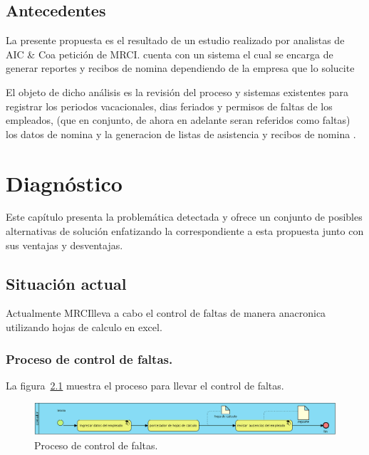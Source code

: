\documentclass[10pt]{book}
\newcommand{\empresa}{AIC \& Co}
\newcommand{\cliente}{MRCI}
\begin{document}
	
\section{Antecedentes} 


	La presente propuesta es el resultado de un estudio realizado por analistas de \empresa a petición de \cliente.
	\Cliente cuenta con un sistema el cual se encarga de generar reportes y recibos de nomina dependiendo de la empresa que lo solucite 
	
	El objeto de dicho análisis es la revisión del proceso y sistemas existentes para registrar los periodos vacacionales, dias feriados y permisos de faltas de los empleados, (que en conjunto, de ahora en adelante seran referidos como faltas) los datos de nomina y la generacion de listas de asistencia y recibos de nomina . 
	





\chapter{Diagnóstico} 

	Este capítulo presenta la problemática detectada y ofrece un conjunto de posibles alternativas de solución enfatizando la correspondiente a esta propuesta junto con sus ventajas y desventajas.
	
\section{Situación actual}

	Actualmente \cliente lleva a cabo el control de faltas de manera anacronica utilizando hojas de calculo en excel.
	
\subsection{Proceso de control de faltas.}

	La figura~\ref{fig:procesoLic} muestra el proceso para llevar el control de faltas.

\begin{figure}[htbp!]
	\begin{center}
		\includegraphics[width=\textwidth]{images/procesoLic}
		\caption{Proceso de control de faltas.}
		\label{fig:procesoLic}
	\end{center}
\end{figure}
\end{document}
